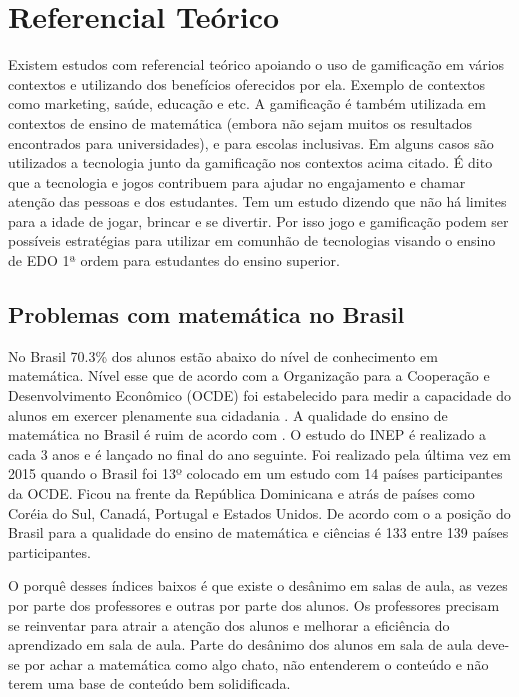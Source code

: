 \chapter[Referencial Teórico]{Referencial Teórico}
Existem estudos com referencial teórico apoiando o uso de gamificação em vários contextos e utilizando dos benefícios oferecidos por ela. Exemplo de contextos como marketing, saúde, educação e etc. A gamificação é também utilizada em contextos de ensino de matemática (embora não sejam muitos os resultados encontrados para universidades), e para escolas inclusivas. Em alguns casos são utilizados a tecnologia junto da gamificação nos contextos acima citado. É dito que a tecnologia e jogos contribuem para ajudar no engajamento e chamar atenção das pessoas e dos estudantes.
Tem um estudo dizendo que não há limites para a idade de jogar, brincar e se divertir. Por isso jogo e gamificação podem ser possíveis estratégias para utilizar em comunhão de tecnologias visando o ensino de EDO 1ª ordem para estudantes do ensino superior.

\section[Problemas com matemática no Brasil]{Problemas com matemática no Brasil}
No Brasil 70.3\% dos alunos estão abaixo do nível de conhecimento em matemática. Nível esse que de acordo com a Organização para a Cooperação e Desenvolvimento Econômico (OCDE) foi estabelecido para medir a capacidade do alunos em exercer plenamente sua cidadania \cite{inep2015nivelcidadania}. A qualidade do ensino de matemática no Brasil é ruim de acordo com \cite{indiceRuimMat} \cite{inep2015}. O estudo do INEP é realizado a cada 3 anos e é lançado no final do ano seguinte. Foi realizado pela última vez em 2015 quando o Brasil foi 13º colocado em um estudo com 14 países participantes da OCDE. Ficou na frente da República Dominicana e atrás de países como Coréia do Sul, Canadá, Portugal e Estados Unidos. De acordo com o \cite{indiceRuimMat} a posição do Brasil para a qualidade do ensino de matemática e ciências é 133 entre 139 países participantes.

O porquê desses índices baixos é que existe o desânimo em salas de aula, as vezes por parte dos professores e outras por parte dos alunos. Os professores precisam se reinventar para atrair a atenção dos alunos e melhorar a eficiência do aprendizado em sala de aula. Parte do desânimo dos alunos em sala de aula deve-se por achar a matemática como algo chato, não entenderem o conteúdo e não terem uma base de conteúdo bem solidificada.

